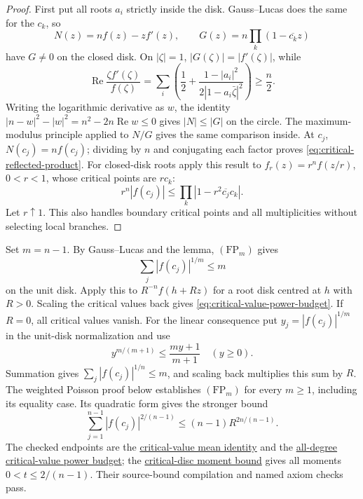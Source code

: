 \documentclass[11pt]{article}
\begin{document}
\begin{proof}
First put all roots $a_i$ strictly inside the disk.  Gauss--Lucas does the
same for the $c_k$, so
\[
 N(z)=nf(z)-zf'(z),\qquad
 G(z)=n\prod_k(1-\overline{c_k}z)
\]
have $G\ne0$ on the closed disk.  On $|\zeta|=1$,
$|G(\zeta)|=|f'(\zeta)|$, while
\[
 \operatorname{Re}\frac{\zeta f'(\zeta)}{f(\zeta)}
 =\sum_i\left(\frac12+
       \frac{1-|a_i|^2}{2|1-a_i\bar\zeta|^2}\right)\ge\frac n2.
\]
Writing the logarithmic derivative as $w$, the identity
$|n-w|^2-|w|^2=n^2-2n\operatorname{Re}w\le0$ gives
$|N|\le|G|$ on the circle.  The maximum-modulus principle applied to
$N/G$ gives the same comparison inside.  At $c_j$, $N(c_j)=nf(c_j)$;
dividing by $n$ and conjugating each factor proves
\eqref{eq:critical-reflected-product}.
For closed-disk roots apply this result to
$f_r(z)=r^nf(z/r)$, $0<r<1$, whose critical points are $rc_k$:
\[
 r^n|f(c_j)|\le\prod_k|1-r^2\overline{c_j}c_k|.
\]
Let $r\uparrow1$.  This also handles boundary critical points and all
multiplicities without selecting local branches.
\end{proof}

Set $m=n-1$. By Gauss--Lucas and the lemma, $(\mathrm{FP}_m)$ gives
\[
 \sum_j |f(c_j)|^{1/m}\le m
\]
on the unit disk. Apply this to $R^{-n}f(h+Rz)$ for a root disk
centred at $h$ with $R>0$. Scaling the critical values back gives
\eqref{eq:critical-value-power-budget}. If $R=0$, all critical values
vanish. For the linear consequence put $y_j=|f(c_j)|^{1/m}$ in the
unit-disk normalization and use
\[
 y^{m/(m+1)}\le\frac{my+1}{m+1}\quad(y\ge0).
\]
Summation gives $\sum_j|f(c_j)|^{1/n}\le m$, and scaling back multiplies
this sum by $R$. The weighted Poisson proof below establishes $(\mathrm{FP}_m)$
for every $m\ge1$, including its equality case. Its quadratic form gives the
stronger bound
\[
 \sum_{j=1}^{n-1}|f(c_j)|^{2/(n-1)}\le(n-1)R^{2n/(n-1)}.
\]
The checked endpoints are the
\href{https://github.com/wcook04/plectis-erdos/blob/3f1a5e9b284b9c3348eebd549e24c2f3972606ae/ErdosProblems/Erdos1041/PaperCriticalValueMeanR10.lean#L101}{critical-value mean identity}
and the
\href{https://github.com/wcook04/plectis-erdos/blob/3f1a5e9b284b9c3348eebd549e24c2f3972606ae/ErdosProblems/Erdos1041/PaperCriticalValueMeanR10.lean#L121}{all-degree critical-value power budget};
the
\href{https://github.com/wcook04/plectis-erdos/blob/3f1a5e9b284b9c3348eebd549e24c2f3972606ae/ErdosProblems/Erdos1041/PaperCriticalValueMeanR10.lean#L85}{critical-disc moment bound}
gives all moments $0<t\le2/(n-1)$. Their source-bound compilation and named
axiom checks pass.
\end{document}
